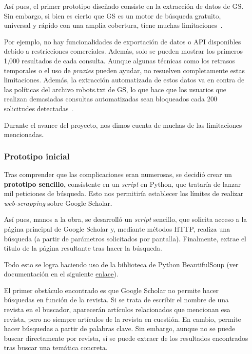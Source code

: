 Así pues, el primer prototipo diseñado consiste en la extracción de datos de GS. Sin embargo, si bien es cierto que GS es un motor de búsqueda gratuito, universal y rápido con una amplia cobertura, tiene muchas limitaciones~\cite{lopez2017}. 


Por ejemplo, no hay funcionalidades de exportación de datos o API disponibles debido a restricciones comerciales. Además, solo se pueden mostrar los primeros 1,000 resultados de cada consulta. Aunque algunas técnicas como los retrasos temporales o el uso de \textit{proxies} pueden ayudar, no resuelven completamente estas limitaciones. Además, la extracción automatizada de estos datos va en contra de las políticas del archivo robots.txt de GS, lo que hace que los usuarios que realizan demasiadas consultas automatizadas sean bloqueados cada 200 solicitudes detectadas~\cite{lopez2017}.

Durante el avance del proyecto, nos dimos cuenta de muchas de las limitaciones mencionadas.

\subsubsection{Prototipo inicial}

Tras comprender que las complicaciones eran numerosas, se decidió crear un \textbf{prototipo sencillo}, consistente en un \textit{script} en Python, que trataría de lanzar mil peticiones de búsqueda. Esto nos permitiría establecer los límites de realizar \textit{web-scrapping} sobre Google Scholar.

Así pues, manos a la obra, se desarrolló un \textit{script} sencillo, que solicita acceso a la página principal de Google Scholar y, mediante métodos HTTP, realiza una búsqueda (a partir de parámetros solicitados por pantalla). Finalmente, extrae el título de la página resultante tras hacer la búsqueda. 

Todo esto se logra haciendo uso de la biblioteca de Python BeautifulSoup (ver documentación en el siguiente \href{https://beautiful-soup-4.readthedocs.io/en/latest/}{enlace}).


El primer obstáculo encontrado es que Google Scholar no permite hacer búsquedas en función de la revista. Si se trata de escribir el nombre de una revista en el buscador, aparecerán artículos relacionados que mencionan esa revista, pero no siempre artículos de la revista en cuestión. En cambio, permite hacer búsquedas a partir de palabras clave.
Sin embargo, aunque no se puede buscar directamente por revista, sí se puede extraer de los resultados encontrados tras buscar una temática concreta.

